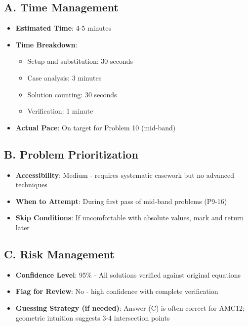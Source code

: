 \documentclass[]{article}
\begin{document}
\begin{competitionbox}
\subsection*{A. Time Management}
\begin{itemize}[leftmargin=*]
    \item \textbf{Estimated Time}: 4-5 minutes
    \item \textbf{Time Breakdown}:
    \begin{itemize}
        \item Setup and substitution: 30 seconds
        \item Case analysis: 3 minutes
        \item Solution counting: 30 seconds
        \item Verification: 1 minute
    \end{itemize}
    \item \textbf{Actual Pace}: On target for Problem 10 (mid-band)
\end{itemize}

\subsection*{B. Problem Prioritization}
\begin{itemize}[leftmargin=*]
    \item \textbf{Accessibility}: Medium - requires systematic casework but no advanced techniques
    \item \textbf{When to Attempt}: During first pass of mid-band problems (P9-16)
    \item \textbf{Skip Conditions}: If uncomfortable with absolute values, mark and return later
\end{itemize}

\subsection*{C. Risk Management}
\begin{itemize}[leftmargin=*]
    \item \textbf{Confidence Level}: 95\% - All solutions verified against original equations
    \item \textbf{Flag for Review}: No - high confidence with complete verification
    \item \textbf{Guessing Strategy (if needed)}: Answer (C) is often correct for AMC12; geometric intuition suggests 3-4 intersection points
\end{itemize}


\end{competitionbox}
\end{document}

